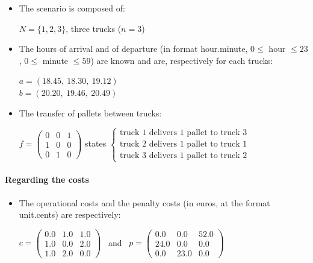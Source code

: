 \documentclass[preprint,12pt,authoryear]{elsarticle}
\begin{document}
\begin{itemize}
    \item The scenario is composed of: 
    
     $N=\{1,2,3\}$, three trucks ($n=3$)

    \item The hours of arrival and of departure (in format hour.minute, $0\le$ hour $\le 23 $, $0\le$ minute $\le59$) are known and are, respectively for each trucks: 
    

      $a=(18.45,\ 18.30,\ 19.12)$\\    
     $b=(20.20,\ 19.46,\ 20.49)$   

    \item The transfer of pallets between trucks: 

     $f=\begin{pmatrix} 
    0&0&1 \\ 
    1&0&0 \\  
    0&1&0
   \end{pmatrix}$  states  
   $\begin{cases}
     \mbox{truck 1 delivers 1 pallet to truck 3}\\
     \mbox{truck 2 delivers 1 pallet to truck 1}\\
     \mbox{truck 3 delivers 1 pallet to truck 2}
   \end{cases}$
   
\end{itemize}


\paragraph{Regarding the costs}

\begin{itemize}
    \item The operational costs and the penalty costs (in euros, at the format unit.cents) are respectively:  
    
       $c=\begin{pmatrix} 
              0.0 & 1.0 & 1.0 \\ 
              1.0 & 0.0 & 2.0 \\  
              1.0 & 2.0 & 0.0
            \end{pmatrix}$
%    
      \ and \ $p=\begin{pmatrix} 
              0.0 & 0.0 & 52.0 \\ 
              24.0 & 0.0 & 0.0 \\  
              0.0 & 23.0 & 0.0
            \end{pmatrix}$
         \smallskip 
\end{itemize}
 
\end{document}
